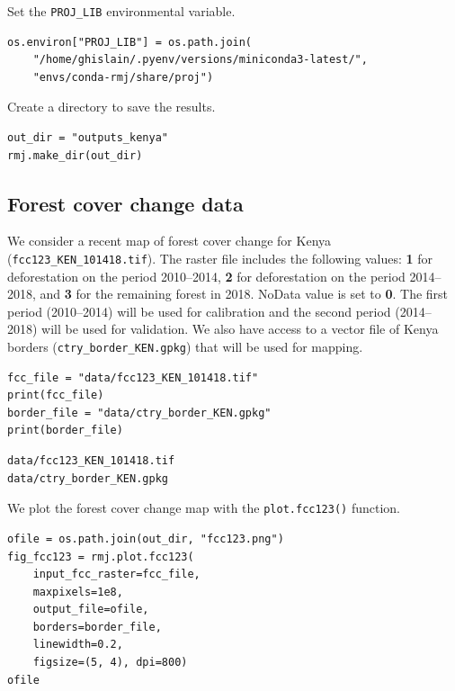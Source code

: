 \documentclass[paper=a4, 12pt, DIV=12]{scrartcl}
\begin{document}
Set the \texttt{PROJ\_LIB} environmental variable.

\begin{verbatim}
os.environ["PROJ_LIB"] = os.path.join(
    "/home/ghislain/.pyenv/versions/miniconda3-latest/",
    "envs/conda-rmj/share/proj")
\end{verbatim}

Create a directory to save the results.

\begin{verbatim}
out_dir = "outputs_kenya"
rmj.make_dir(out_dir)
\end{verbatim}

\subsection{Forest cover change data}
\label{sec:org403df6a}

We consider a recent map of forest cover change for Kenya (\texttt{fcc123\_KEN\_101418.tif}). The raster file includes the following values: \textbf{1} for deforestation on the period 2010--2014, \textbf{2} for deforestation on the period 2014--2018, and \textbf{3} for the remaining forest in 2018. NoData value is set to \textbf{0}. The first period (2010--2014) will be used for calibration and the second period (2014--2018) will be used for validation. We also have access to a vector file of Kenya borders (\texttt{ctry\_border\_KEN.gpkg}) that will be used for mapping.

\begin{verbatim}
fcc_file = "data/fcc123_KEN_101418.tif"
print(fcc_file)
border_file = "data/ctry_border_KEN.gpkg"
print(border_file)
\end{verbatim}

\begin{verbatim}
data/fcc123_KEN_101418.tif
data/ctry_border_KEN.gpkg
\end{verbatim}


We plot the forest cover change map with the \texttt{plot.fcc123()} function.

\begin{verbatim}
ofile = os.path.join(out_dir, "fcc123.png")
fig_fcc123 = rmj.plot.fcc123(
    input_fcc_raster=fcc_file,
    maxpixels=1e8,
    output_file=ofile,
    borders=border_file,
    linewidth=0.2,
    figsize=(5, 4), dpi=800)
ofile
\end{verbatim}
\end{document}
